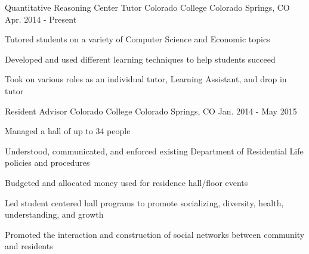 \begin{cventries}

\vspace{-1.25em}
\cventry
{Quantitative Reasoning Center Tutor} %
{Colorado College} %
{Colorado Springs, CO} %
{Apr. 2014 - Present} %
{ %
\begin{cvitems}
\item {Tutored students on a variety of Computer Science and Economic topics}
\item {Developed and used different learning techniques to help students succeed}
\item {Took on various roles as an individual tutor, Learning Assistant, and drop in tutor}
\end{cvitems}
}


\vspace{-1.25em}
\cventry
{Resident Advisor} %
{Colorado College} %
{Colorado Springs, CO} %
{Jan. 2014 - May 2015} %
{ %
\begin{cvitems}
\item {Managed a hall of up to 34 people}
\item {Understood, communicated, and enforced existing Department of Residential Life policies and procedures}
\item{Budgeted and allocated money used for residence hall/floor events}
\item{Led student centered hall programs to promote socializing, diversity, health, understanding, and growth}
\item{Promoted the interaction and construction of social networks between community and residents}
\end{cvitems} 
}




\end{cventries}
